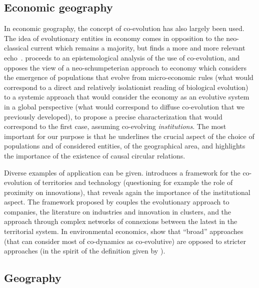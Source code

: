 \documentclass[letterpaper]{article}
\begin{document}
\subsection{Economic geography}

In economic geography, the concept of co-evolution has also largely been used. The idea of evolutionary entities in economy comes in opposition to the neo-classical current which remains a majority, but finds a more and more relevant echo~\citep{nelson2009evolutionary}. \cite{schamp201020} proceeds to an epistemological analysis of the use of co-evolution, and opposes the view of a neo-schumpeterian approach to economy which considers the emergence of populations that evolve from micro-economic rules (what would correspond to a direct and relatively isolationist reading of biological evolution) to a systemic approach that would consider the economy as an evolutive system in a global perspective (what would correspond to diffuse co-evolution that we previously developed), to propose a precise characterization that would correspond to the first case, assuming co-evolving \emph{institutions}. The most important for our purpose is that he underlines the crucial aspect of the choice of populations and of considered entities, of the geographical area, and highlights the importance of the existence of causal circular relations.


Diverse examples of application can be given. \cite{colletis2010co} introduces a framework for the co-evolution of territories and technology (questioning for example the role of proximity on innovations), that reveals again the importance of the institutional aspect. The framework proposed by \cite{ter2011co} couples the evolutionary approach to companies, the literature on industries and innovation in clusters, and the approach through complex networks of connexions between the latest in the territorial system. In environmental economics, \cite{kallis2007coevolution} show that ``broad'' approaches (that can consider most of co-dynamics as co-evolutive) are opposed to stricter approaches (in the spirit of the definition given by \cite{schamp201020}).

\subsection{Geography}
\end{document}
